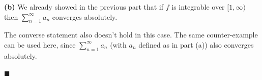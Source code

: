 \documentclass[12pt]{article}
\begin{document}
\vspace{5mm}

\noindent\textcolor[rgb]{0.1,0.5,0.4}{\textbf{(b)}} We already showed in the previous part that if $f$ is integrable over $[1,\infty)$ then $\sum\limits_{n=1}^{\infty} a_n$ converges absolutely. 

The converse statement also doesn't hold in this case. The same counter-example can be used here, since $\sum\limits_{n=1}^{\infty} a_n$ (with $a_n$ defined as in part (a)) also converges absolutely.

\hfill$\blacksquare$

\vfill

\begin{center}
\\
\vspace{2mm}
\vspace{-0.65cm}
\hrulefill \\
\vspace{-0.95cm}
\hrulefill
\end{center}
\end{document}

